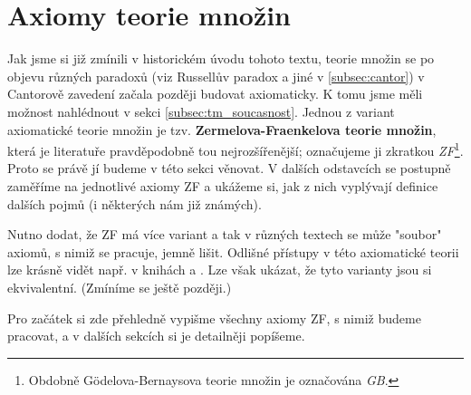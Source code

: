 \chapter{Axiomy teorie množin}\label{chap:axiomy_tm}
Jak jsme si již zmínili v historickém úvodu tohoto textu, teorie množin se po objevu různých paradoxů (viz Russellův paradox a jiné v \ref{subsec:cantor}) v Cantorově zavedení začala později budovat axiomaticky. K tomu jsme měli možnost nahlédnout v sekci \ref{subsec:tm_soucasnost}. Jednou z variant axiomatické teorie množin je tzv. \textbf{Zermelova-Fraenkelova teorie množin}, která je literatuře pravděpodobně tou nejrozšířenější; označujeme ji zkratkou \emph{ZF}\footnote{Obdobně Gödelova-Bernaysova teorie množin je označována \emph{GB}.}. Proto se právě jí budeme v této sekci věnovat. V dalších odstavcích se postupně zaměříme na jednotlivé axiomy ZF a ukážeme si, jak z nich vyplývají definice dalších pojmů (i některých nám již známých).\par
Nutno dodat, že ZF má více variant a tak v různých textech se může "soubor" axiomů, s nimiž se pracuje, jemně lišit. Odlišné přístupy v této axiomatické teorii lze krásně vidět např. v knihách \cite{BalcarStepanek1986} a \cite{Goldrei2017}. Lze však ukázat, že tyto varianty jsou si ekvivalentní. (Zmíníme se ještě později.)\par
Pro začátek si zde přehledně vypišme všechny axiomy ZF, s nimiž budeme pracovat, a v dalších sekcích si je detailněji popíšeme.
\medskip

